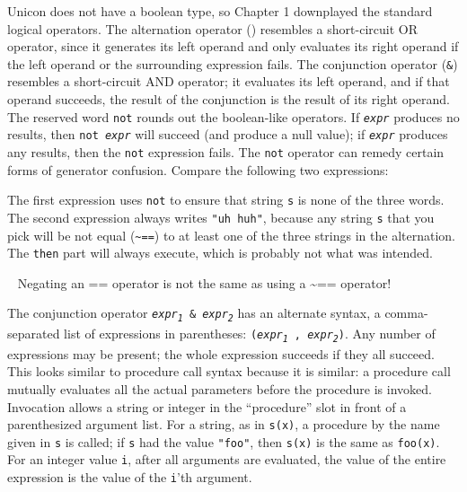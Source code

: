 Unicon does not have a boolean type, so
Chapter 1 downplayed the standard logical operators. The
alternation operator
(\texttt{{\textbar}}) resembles a short-circuit OR
operator, since it generates its left operand and only evaluates its
right operand if the left operand or the surrounding expression fails.
The conjunction operator (\texttt{\&}) resembles a short-circuit
AND operator; it evaluates its left operand,
and if that operand succeeds, the result of the conjunction is the
result of its right operand. The reserved word \texttt{not} rounds out
the boolean-like operators. If \texttt{\textit{expr}} produces no
results, then \texttt{not }\texttt{\textit{expr}} will
succeed (and produce a null value); if \texttt{\textit{expr}} produces
any results, then the \texttt{not} expression fails. The \texttt{not}
operator can remedy certain forms of generator confusion. Compare the
following two expressions:


The first expression uses \texttt{not} to ensure that string \texttt{s}
is none of the three words. The second expression always writes
\texttt{"uh huh"}, because any string
\texttt{s} that you pick will be not equal (\texttt{\~{}==}) to at
least one of the three strings in the alternation. The \texttt{then}
part will always execute, which is probably not what was intended.

\medskip{}\ {\sffamily
Negating an == operator is not the same as using a \~{}== operator!}\medskip

The conjunction operator
\texttt{\textit{expr}}\texttt{\textit{\textsubscript{1}}}\texttt{ \&
}\texttt{\textit{expr}}\texttt{\textit{\textsubscript{2}}} has an
alternate syntax, a comma-separated list of expressions in parentheses:
\texttt{(}\texttt{\textit{expr}}\texttt{\textit{\textsubscript{1}}}\texttt{
, }\texttt{\textit{expr}}\texttt{\textit{\textsubscript{2}}}\texttt{)}.
Any number of expressions may be present; the whole expression
succeeds if they all succeed. This looks similar to procedure call syntax
because it is similar: a procedure call mutually
evaluates all the actual parameters before the procedure is invoked.
Invocation allows a string or integer in the ``procedure'' slot
in front of a parenthesized argument
list. For a string, as in
\texttt{s(x)}, a procedure by the name given in \texttt{s} is called;
if \texttt{s} had the value \texttt{"foo"},
then \texttt{s(x)} is the same as \texttt{foo(x)}. For an integer value
\texttt{i}, after all arguments are evaluated, the value of the entire
expression is the value of the \texttt{i}'th argument.


